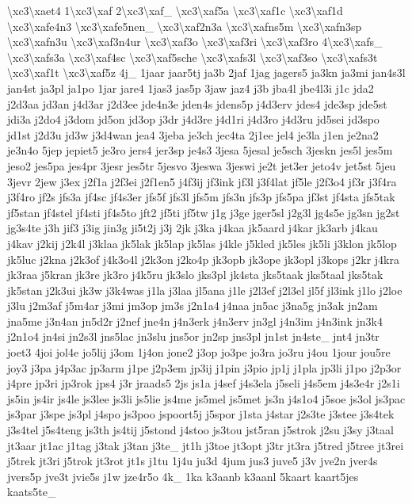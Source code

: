 \begin{DoxyCompactItemize}
\textbackslash{}xc3\textbackslash{}xaet4 1\textbackslash{}xc3\textbackslash{}xaf 2\textbackslash{}xc3\textbackslash{}xaf\-\_\- \textbackslash{}xc3\textbackslash{}xaf5a \textbackslash{}xc3\textbackslash{}xaf1c \textbackslash{}xc3\textbackslash{}xaf1d \textbackslash{}xc3\textbackslash{}xafe4n3 \textbackslash{}xc3\textbackslash{}xafe5nen\-\_\- \textbackslash{}xc3\textbackslash{}xaf2n3a \textbackslash{}xc3\textbackslash{}xafns5m \textbackslash{}xc3\textbackslash{}xafn3sp \textbackslash{}xc3\textbackslash{}xafn3u \textbackslash{}xc3\textbackslash{}xaf3n4ur \textbackslash{}xc3\textbackslash{}xaf3o \textbackslash{}xc3\textbackslash{}xaf3ri \textbackslash{}xc3\textbackslash{}xaf3ro 4\textbackslash{}xc3\textbackslash{}xafs\-\_\- \textbackslash{}xc3\textbackslash{}xafs3a \textbackslash{}xc3\textbackslash{}xaf4sc \textbackslash{}xc3\textbackslash{}xaf5sche \textbackslash{}xc3\textbackslash{}xafs3l \textbackslash{}xc3\textbackslash{}xaf3so \textbackslash{}xc3\textbackslash{}xafs3t \textbackslash{}xc3\textbackslash{}xaf1t \textbackslash{}xc3\textbackslash{}xaf5z 4j\-\_\- 1jaar jaar5tj ja3b 2jaf 1jag jagers5 ja3kn ja3mi jan4s3l jan4st ja3pl ja1po 1jar jare4 1jas3 jas5p 3jaw jaz4 j3b jba4l jbe4l3i j1c jda2 j2d3aa jd3an j4d3ar j2d3ee jde4n3e jden4s jdens5p j4d3erv jdes4 jde3sp jde5st jdi3a j2do4 j3dom jd5on jd3op j3dr j4d3re j4d1ri j4d3ro j4d3ru jd5sei jd3spo jd1st j2d3u jd3w j3d4wan jea4 3jeba je3ch jec4ta 2j1ee jel4 je3la j1en je2na2 je3n4o 5jep jepiet5 je3ro jers4 jer3sp je4s3 3jesa 5jesal je5sch 3jeskn jes5l jes5m jeso2 jes5pa jes4pr 3jesr jes5tr 5jesvo 3jeswa 3jeswi je2t jet3er jeto4v jet5st 5jeu 3jevr 2jew j3ex j2f1a j2f3ei j2f1en5 j4f3ij jf3ink jf3l j3f4lat jf5le j2f3o4 jf3r j3f4ra j3f4ro jf2s jfs3a jf4sc jf4s3er jfs5f jfs3l jfs5m jfs3n jfs3p jfs5pa jf3st jf4sta jfs5tak jf5stan jf4stel jf4sti jf4s5to jft2 jf5ti jf5tw j1g j3ge jger5sl j2g3l jg4s5e jg3sn jg2st jg3s4te j3h jif3 j3ig jin3g ji5t2j j3j 2jk j3ka j4kaa jk5aard j4kar jk3arb j4kau j4kav j2kij j2k4l j3klaa jk5lak jk5lap jk5las j4kle j5kled jk5les jk5li j3klon jk5lop jk5luc j2kna j2k3of j4k3o4l j2k3on j2ko4p jk3opb jk3ope jk3opl j3kops j2kr j4kra jk3raa j5kran jk3re jk3ro j4k5ru jk3slo jks3pl jk4sta jks5taak jks5taal jks5tak jk5stan j2k3ui jk3w j3k4was j1la j3laa jl5ana j1le j2l3ef j2l3el jl5f jl3ink j1lo j2loe j3lu j2m3af j5m4ar j3mi jm3op jm3s j2n1a4 j4naa jn5ac j3na5g jn3ak jn2am jna5me j3n4an jn5d2r j2nef jne4n j4n3erk j4n3erv jn3gl j4n3im j4n3ink jn3k4 j2n1o4 jn4si jn2s3l jns5lac jn3slu jns5or jn2sp jns3pl jn1st jn4ste\-\_\- jnt4 jn3tr joet3 4joi jol4e jo5lij j3om 1j4on jone2 j3op jo3pe jo3ra jo3ru j4ou 1jour jou5re joy3 j3pa j4p3ac jp3arm j1pe j2p3em jp3ij j1pin j3pio jp1j j1pla jp3li j1po j2p3or j4pre jp3ri jp3rok jps4 j3r jraads5 2js js1a j4sef j4s3ela j5seli j4s5em j4s3e4r j2s1i js5in js4ir js4le js3lee js3li js5lie js4me js5mel js5met js3n j4s1o4 j5soe js3ol js3pac js3par j3spe js3pl j4spo js3poo jspoort5j j5spor j1sta j4star j2s3te j3stee j3s4tek j3s4tel j5s4teng js3th js4tij j5stond j4stoo js3tou jst5ran j5strok j2su j3sy j3taal jt3aar jt1ac j1tag j3tak j3tan j3te\-\_\- jt1h j3toe jt3opt j3tr jt3ra j5tred j5tree jt3rei j5trek jt3ri j5trok jt3rot jt1s j1tu 1j4u ju3d 4jum jus3 juve5 j3v jve2n jver4s jvers5p jve3t jvie5s j1w jze4r5o 4k\-\_\- 1ka k3aanb k3aanl 5kaart kaart5jes kaats5te\-\_\- 
\end{DoxyCompactItemize}
